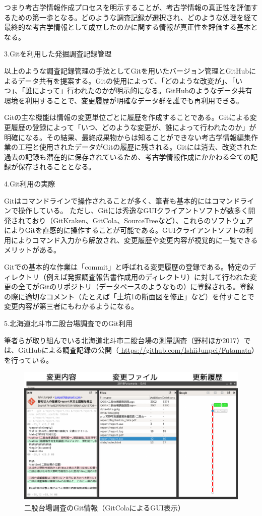 \documentclass[9pt,b5j,papersize]{jsarticle}
\begin{document}
\begin{multicols}{2}
つまり考古学情報作成プロセスを明示することが、考古学情報の真正性を評価するための第一歩となる。どのような調査記録が選択され、どのような処理を経て最終的な考古学情報として成立したのかに関する情報が真正性を評価する基本となる。

\noindent
{\large 3.Gitを利用した発掘調査記録管理}

以上のような調査記録管理の手法としてGitを用いたバージョン管理とGitHubによるデータ共有を提案する。Gitの使用によって、「どのような改変が」、「いつ」、「誰によって」行われたのかが明示的になる。GitHubのようなデータ共有環境を利用することで、変更履歴が明確なデータ群を誰でも再利用できる。

Gitの主な機能は情報の変更単位ごとに履歴を作成することである。Gitによる変更履歴の登録によって「いつ、どのような変更が、誰によって行われたのか」が明確になる。その結果、最終成果物からは知ることができない考古学情報編集作業の工程と使用されたデータがGitの履歴に残される。Gitには消去、改変された過去の記録も潜在的に保存されているため、考古学情報作成にかかわる全ての記録が保存されることとなる。

\noindent
{\large 4.Git利用の実際}

Gitはコマンドラインで操作されることが多く、筆者も基本的にはコマンドラインで操作している。
ただし、Gitには秀逸なGUIクライアントソフトが数多く開発されており（GitKraken、GitCola、SourceTreeなど）、これらのソフトウェアによりGitを直感的に操作することが可能である。GUIクライアントソフトの利用によりコマンド入力から解放され、変更履歴や変更内容が視覚的に一覧できるメリットがある。

Gitでの基本的な作業は「commit」と呼ばれる変更履歴の登録である。特定のディレクトリ（例えば発掘調査報告書作成用のディレクトリ）に対して行われた変更の全てがGitのリポジトリ（データベースのようなもの）に登録される。登録の際に適切なコメント（たとえば「土坑1の断面図を修正」など）を付すことで変更内容が第三者にもわかるようになる。

\noindent
{\large 5.北海道北斗市二股台場調査でのGit利用}

筆者らが取り組んでいる北海道北斗市二股台場の測量調査（野村ほか2017）では、GitHubによる調査記録の公開（\url{ https://github.com/IshiiJunpei/Futamata}）を行っている。

\begin{figure}[H]
\centering
\includegraphics[width=1\columnwidth]{fig/01.pdf}
\caption{二股台場調査のGit情報（GitColaによるGUI表示）}
\label{hutamata}
\end{figure}


\end{multicols}
\end{document}
